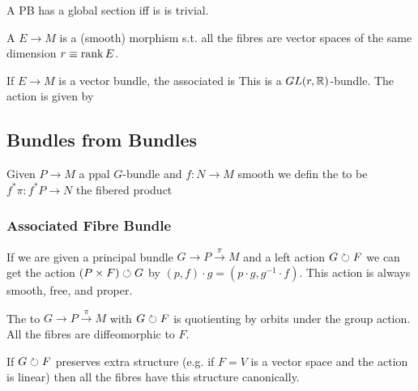 \documentclass{article}
\begin{document}
\begin{lemma}
A PB has a global section iff is is trivial. 
\end{lemma}



\begin{definition}
A  $E \to M$ is a (smooth) morphism s.t. all the fibres are vector spaces of the same dimension $r\equiv\operatorname{rank} E$. 
\end{definition}

\begin{definition}
If $E \to M$ is a vector bundle, the associated  is 
This is a $GL(r,\mathbb{R})$-bundle. The action is given by 
\end{definition}

\subsection{Bundles from Bundles}
\begin{definition}
	Given $P \to M$ a ppal $G$-bundle and $f:N \to M$ smooth we defin the  to be 
	$f^\ast \pi : f^\ast P \to N$ the fibered product 
\end{definition}

\subsubsection{Associated Fibre Bundle}
If we are given a principal bundle $G \to P \overset{\pi}{\to} M$ and a left action $G \circlearrowright F$ we can get the action $(P \times F) \circlearrowleft G$ by $(p,f) \cdot g = (p\cdot g, g^{-1} \cdot f)$. This action is always smooth, free, and proper. 

\begin{definition}
The  to $G \to P \overset{\pi}{\to} M$ with $G \circlearrowright F$ is 
quotienting by orbits under the group action. All the fibres are diffeomorphic to $F$. 
\end{definition}

If $G \circlearrowright F$ preserves extra structure (e.g. if $F=V$ is a vector space and the action is linear) then all the fibres have this structure canonically. 
\end{document}
